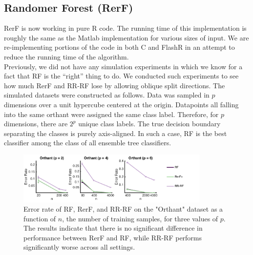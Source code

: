 \documentclass[simplex.tex]{subfiles}
\begin{document}
\subsection[Randomer Forest]{Randomer Forest (RerF)}

RerF is now working in pure R code.  The running time of this
implementation is roughly the same as the Matlab implementation for
various sizes of input.  We are re-implementing portions of the code in
both C and FlashR in an attempt to reduce the running time of the
algorithm. \\


Previously, we did not have any simulation experiments in which we know
for a fact that RF is the ``right'' thing to do. We conducted such
experiments to see how much RerF and RR-RF lose by allowing oblique
split directions. The simulated datasets were constructed as follows.
Data was sampled in $p$ dimensions over a unit hypercube centered at the
origin. Datapoints all falling into the same orthant were assigned the
same class label. Therefore, for $p$ dimensions, there are $2^p$ unique
class labels. The true decision boundary separating the classes is
purely axis-aligned. In such a case, RF is the best classifier among the
class of all ensemble tree classifiers.

\begin{figure}[!h]
\begin{cframed}
\centering
\includegraphics[width=0.85\textwidth]{../../figs/RerF_2017_02.png}
\caption{Error rate of RF, RerF, and RR-RF on the "Orthant" dataset as a
  function of $n$, the number of training samples, for three values of
  $p$. The results indicate that there is no significant difference in
  performance between RerF and RF, while RR-RF performs significantly
  worse across all settings.}
\label{fig:name}
\end{cframed}
\end{figure}


\clearpage
\end{document}
